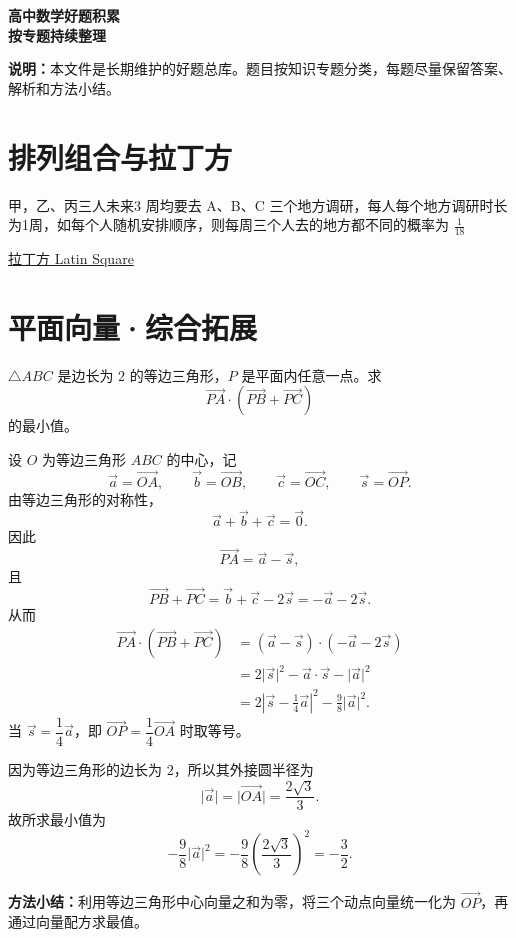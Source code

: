\documentclass[zihao=-4]{exam-zh}
\begin{document}
\begin{center}
  {\bfseries 高中数学好题积累}\\[4pt]
  {\bfseries 按专题持续整理}
\end{center}

\noindent\textbf{说明：}本文件是长期维护的好题总库。题目按知识专题分类，每题尽量保留答案、解析和方法小结。

\section{排列组合与拉丁方}
	
	甲，乙、丙三人未来3 周均要去 A、B、C 三个地方调研，每人每个地方调研时长	为1周，如每个人随机安排顺序，则每周三个人去的地方都不同的概率为 \textbf{$\frac{1}{18}$}
	
	\href{https://en.wikipedia.org/wiki/Latin_square}{拉丁方 Latin Square}


\section{平面向量·综合拓展}

\begin{question}
$\triangle ABC$ 是边长为 $2$ 的等边三角形，$P$ 是平面内任意一点。求
\[
  \overrightarrow{PA}\cdot
  \left(\overrightarrow{PB}+\overrightarrow{PC}\right)
\]
的最小值。

\begin{solution}
设 $O$ 为等边三角形 $ABC$ 的中心，记
\[
 \vec a=\overrightarrow{OA},\qquad
 \vec b=\overrightarrow{OB},\qquad
 \vec c=\overrightarrow{OC},\qquad
 \vec s=\overrightarrow{OP}.
\]
由等边三角形的对称性，
\[
 \vec a+\vec b+\vec c=\vec 0.
\]
因此
\[
 \overrightarrow{PA}=\vec a-\vec s,
\]
且
\[
 \overrightarrow{PB}+\overrightarrow{PC}
 =\vec b+\vec c-2\vec s
 =-\vec a-2\vec s.
\]
从而
\begin{align*}
 \overrightarrow{PA}\cdot
 \left(\overrightarrow{PB}+\overrightarrow{PC}\right)
 &= (\vec a-\vec s)\cdot(-\vec a-2\vec s)\\
 &=2\lvert\vec s\rvert^2-\vec a\cdot\vec s-
   \lvert\vec a\rvert^2\\
 &=2\left\lvert\vec s-\frac14\vec a\right\rvert^2
   -\frac98\lvert\vec a\rvert^2.
\end{align*}
当 $\vec s=\dfrac14\vec a$，即
$\overrightarrow{OP}=\dfrac14\overrightarrow{OA}$ 时取等号。

因为等边三角形的边长为 $2$，所以其外接圆半径为
\[
 \lvert\vec a\rvert=\lvert\overrightarrow{OA}\rvert
 =\frac{2\sqrt3}{3}.
\]
故所求最小值为
\[
 -\frac98\lvert\vec a\rvert^2
 =-\frac98\left(\frac{2\sqrt3}{3}\right)^2
 =\boxed{-\frac32}.
\]

\textbf{方法小结：}利用等边三角形中心向量之和为零，将三个动点向量统一化为 $\overrightarrow{OP}$，再通过向量配方求最值。
\end{solution}
\end{question}
\end{document}
